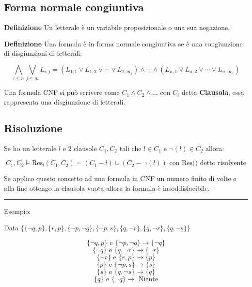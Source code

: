 \documentclass{article}
\begin{document}
\subsection{Forma normale congiuntiva}

\textbf{Definizione} Un letterale è un variabile proposizionale o una sua negazione.\newline

\noindent\textbf{Definizione} Una formula è in forma normale congiuntiva se è una congiunzione di disgiunzioni di letterali:

$$\bigwedge_{i\leq n} \bigvee_{j\leq m} L_{i,j} =\left( L_{1,1} \lor L_{1,2} \lor \cdots \lor L_{1,m_1} \right) \land \cdots \land \left( L_{n,1} \lor L_{n,2} \lor \cdots \lor L_{n,m_n} \right)$$\newline

\noindent Una formula CNF si può scrivere come $C_1\land C_2\land \ldots$ con $C_i$ detta \textbf{Clausola}, essa rappresenta una disgiunzione di letterali.

\newpage

\subsection{Risoluzione}

\noindent Se ho un letterale $l$ e 2 clausole $C_1,C_2$ tali che $l\in C_1$ e $\neg(l)\in C_2$ allora:

$$C_1,C_2 \models \text{Res}_l(C_1,C_2)=(C_1-{l})\cup(C_2-\neg(l)) \text{ con Res() detto risolvente}$$

\noindent Se applico questo concetto ad una formula in CNF un numero finito di volte e alla fine ottengo la clausola vuota allora la formula è insoddisfacibile.

\noindent\rule{\textwidth}{0.5pt}\newline

\noindent Esempio:\newline

\noindent Data $\{\{\neg q, p\}, \{r, p\}, \{\neg p, \neg q\},\{\neg p,s\},\{q,\neg r\},\{q,\neg r\},\{q,\neg s\}\}$

$$\{\neg q, p\} \text{ e } \{\neg p, \neg q\} \rightarrow \{\neg q\}$$
$$\{\neg q\} \text{ e } \{q, \neg r\} \rightarrow \{\neg r\}$$
$$\{\neg r\} \text{ e } \{r, p\} \rightarrow \{p\}$$
$$\{p\} \text{ e } \{\neg p, s\} \rightarrow \{s\}$$
$$\{s\} \text{ e } \{q, \neg s\} \rightarrow \{q\}$$
$$\{q\} \text{ e } \{\neg q\} \rightarrow \text{ Niente}$$\newline
\end{document}
